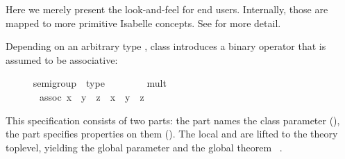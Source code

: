 \begin{isabellebody}
\begin{isamarkuptext}
  Here we merely present the look-and-feel for end users.
  Internally, those are mapped to more primitive Isabelle concepts.
  See \cite{Haftmann-Wenzel:2006:classes} for more detail.%
\end{isamarkuptext}%
\isamarkuptrue%
%
\isamarkuptrue%
%
\isamarkuptrue%
%
\begin{isamarkuptext}%
Depending on an arbitrary type \isa{{\isasymalpha}}, class  introduces a binary operator \isa{{\isasymotimes}} that is
  assumed to be associative:%
\end{isamarkuptext}%
\isamarkuptrue%
\ \ \ \ \isamarkupfalse%
\ semigroup\ {\isacharequal}\ type\ {\isacharplus}\isanewline
\ \ \ \ \ \ \ mult\ {\isacharcolon}{\isacharcolon}\ {\isachardoublequoteopen}{\isasymalpha}\ {\isasymRightarrow}\ {\isasymalpha}\ {\isasymRightarrow}\ {\isasymalpha}{\isachardoublequoteclose}\ \ \ \ {\isacharparenleft}\ {\isachardoublequoteopen}{\isasymotimes}{\isachardoublequoteclose}\ {}{}{\isacharparenright}\isanewline
\ \ \ \ \ \ \ assoc{\isacharcolon}\ {\isachardoublequoteopen}{\isacharparenleft}x\ {\isasymotimes}\ y{\isacharparenright}\ {\isasymotimes}\ z\ {\isacharequal}\ x\ {\isasymotimes}\ {\isacharparenleft}y\ {\isasymotimes}\ z{\isacharparenright}{\isachardoublequoteclose}%
\begin{isamarkuptext}%
\noindent This \isa{{\isasymCLASS}} specification consists of two
  parts: the  part names the class parameter (\isa{{\isasymFIXES}}), the  part specifies properties on them
  (\isa{{\isasymASSUMES}}).  The local \isa{{\isasymFIXES}} and \isa{{\isasymASSUMES}} are lifted to the theory toplevel, yielding the global
  parameter  and the
  global theorem ~.%
\end{isamarkuptext}%
\isamarkuptrue%
%
\end{isabellebody}
